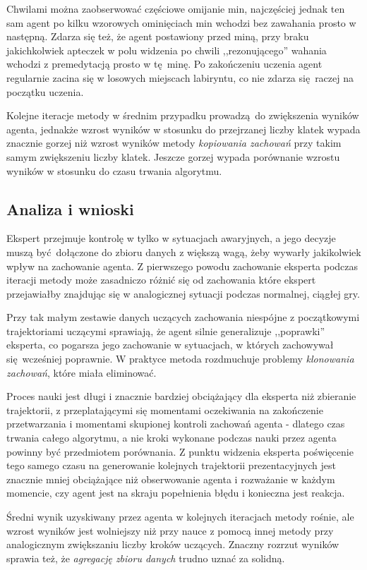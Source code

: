 Chwilami można zaobserwować częściowe omijanie min, najczęściej jednak ten sam agent po kilku wzorowych ominięciach min wchodzi bez zawahania prosto w następną. Zdarza się też, że agent postawiony przed miną, przy braku jakichkolwiek apteczek w polu widzenia po chwili ,,rezonującego'' wahania wchodzi z premedytacją prosto w tę minę. Po zakończeniu uczenia agent regularnie zacina się w losowych miejscach labiryntu, co nie zdarza się raczej na początku uczenia.

Kolejne iteracje metody w średnim przypadku prowadzą do zwiększenia wyników agenta, jednakże wzrost wyników w stosunku do przejrzanej liczby klatek wypada znacznie gorzej niż wzrost wyników metody \textit{kopiowania zachowań} przy takim samym zwiększeniu liczby klatek. Jeszcze gorzej wypada porównanie wzrostu wyników w stosunku do czasu trwania algorytmu. 

\subsection {Analiza i wnioski}

Ekspert przejmuje kontrolę w tylko w sytuacjach awaryjnych, a jego decyzje muszą być dołączone do zbioru danych z większą wagą, żeby wywarły jakikolwiek wpływ na zachowanie agenta. Z pierwszego powodu zachowanie eksperta podczas iteracji metody może zasadniczo różnić się od zachowania które ekspert przejawiałby znajdując się w analogicznej sytuacji podczas normalnej, ciągłej gry.

Przy tak małym zestawie danych uczących zachowania niespójne z początkowymi trajektoriami uczącymi sprawiają, że agent silnie generalizuje ,,poprawki'' eksperta, co pogarsza jego zachowanie w sytuacjach, w których zachowywał się wcześniej poprawnie. W praktyce metoda rozdmuchuje problemy \textit{ klonowania zachowań}, które miała eliminować.

Proces nauki jest długi i znacznie bardziej obciążający dla eksperta niż zbieranie trajektorii, z przeplatającymi się momentami oczekiwania na zakończenie przetwarzania i momentami skupionej kontroli zachowań agenta - dlatego czas trwania całego algorytmu, a nie kroki wykonane podczas nauki przez agenta powinny być przedmiotem porównania. Z punktu widzenia eksperta poświęcenie tego samego czasu na generowanie kolejnych trajektorii prezentacyjnych jest znacznie mniej obciążające niż obserwowanie agenta i rozważanie w każdym momencie, czy agent jest na skraju popełnienia błędu i konieczna jest reakcja.

Średni wynik uzyskiwany przez agenta w kolejnych iteracjach metody rośnie, ale wzrost wyników jest wolniejszy niż przy nauce z pomocą innej metody przy analogicznym zwiększaniu liczby kroków uczących. Znaczny rozrzut wyników sprawia też, że \textit{agregację zbioru danych} trudno uznać za solidną.
